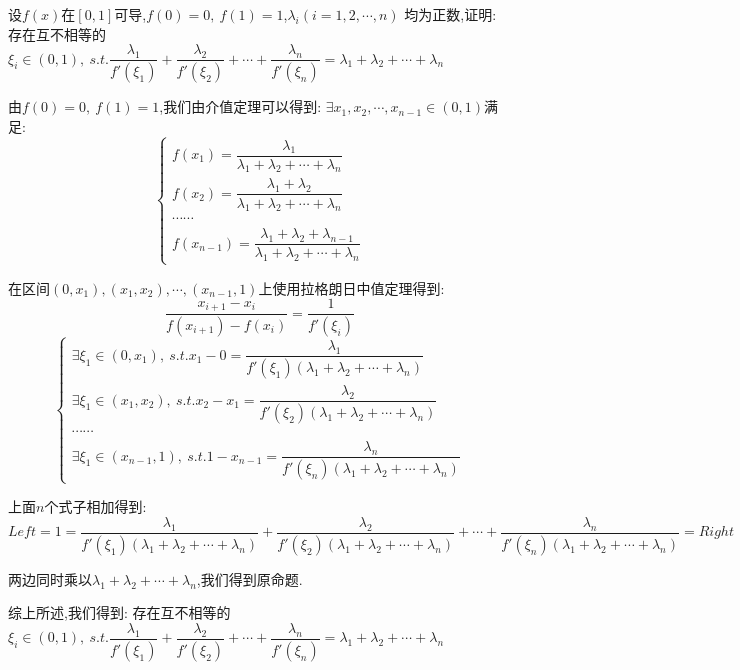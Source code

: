 \begin{proposition}\label{pro: $n$中值问题}
	设$f(x)$在$[0,1]$可导,$f(0)=0,\ f(1)=1$,$\lambda_{i}(i=1,2,\cdots,n)$ 均为正数,证明: 存在互不相等的 $\xi_{i}\in(0,1),\ s.t. \dfrac{\lambda_{1}}{f'(\xi_{1})}+\dfrac{\lambda_{2}}{f'(\xi_{2})}+\cdots+\dfrac{\lambda_{n}}{f'(\xi_{n})}=\lambda_{1}+\lambda_{2}+\cdots+\lambda_{n}$
\end{proposition}
\begin{solution}

	由$f(0)=0,\ f(1)=1$,我们由介值定理可以得到: $\exists x_{1},x_{2},\cdots,x_{n-1}\in(0,1)$满足:
	$$\left\lbrace
		\begin{array}{l}
			f(x_{1})=\dfrac{\lambda_{1}}{\lambda_{1}+\lambda_{2}+\cdots+\lambda_{n}}             \\
			f(x_{2})=\dfrac{\lambda_{1}+\lambda_{2}}{\lambda_{1}+\lambda_{2}+\cdots+\lambda_{n}} \\
			\cdots\cdots                                                                         \\
			f(x_{n-1})=\dfrac{\lambda_{1}+\lambda_{2}+\lambda_{n-1}}{\lambda_{1}+\lambda_{2}+\cdots+\lambda_{n}}
		\end{array}
		\right. $$

	在区间$(0,x_{1}),(x_{1},x_{2}),\cdots,(x_{n-1},1)$上使用拉格朗日中值定理得到:
	$$\dfrac{x_{i+1}-x_{i}}{f(x_{i+1})-f(x_{i})}=\dfrac{1}{f'(\xi_{i})}$$
	$$\left\lbrace
		\begin{array}{l}
			\exists\xi_{1}\in(0,x_{1}),\ s.t. x_{1}-0=\dfrac{\lambda_{1}}{f'(\xi_{1})(\lambda_{1}+\lambda_{2}+\cdots+\lambda_{n})}         \\
			\exists\xi_{1}\in(x_{1},x_{2}),\ s.t. x_{2}-x_{1}=\dfrac{\lambda_{2}}{f'(\xi_{2})(\lambda_{1}+\lambda_{2}+\cdots+\lambda_{n})} \\
			\cdots\cdots                                                                                                                   \\
			\exists\xi_{1}\in(x_{n-1},1),\ s.t. 1-x_{n-1}=\dfrac{\lambda_{n}}{f'(\xi_{n})(\lambda_{1}+\lambda_{2}+\cdots+\lambda_{n})}
		\end{array}
		\right. $$

	上面$n$个式子相加得到:
	$$Left=1=\dfrac{\lambda_{1}}{f'(\xi_{1})(\lambda_{1}+\lambda_{2}+\cdots+\lambda_{n})}+\dfrac{\lambda_{2}}{f'(\xi_{2})(\lambda_{1}+\lambda_{2}+\cdots+\lambda_{n})}+\cdots+\dfrac{\lambda_{n}}{f'(\xi_{n})(\lambda_{1}+\lambda_{2}+\cdots+\lambda_{n})}=Right$$

	两边同时乘以$\lambda_{1}+\lambda_{2}+\cdots+\lambda_{n}$,我们得到原命题.

	综上所述,我们得到: 存在互不相等的 $\xi_{i}\in(0,1),\ s.t. \dfrac{\lambda_{1}}{f'(\xi_{1})}+\dfrac{\lambda_{2}}{f'(\xi_{2})}+\cdots+\dfrac{\lambda_{n}}{f'(\xi_{n})}=\lambda_{1}+\lambda_{2}+\cdots+\lambda_{n}$
\end{solution}

